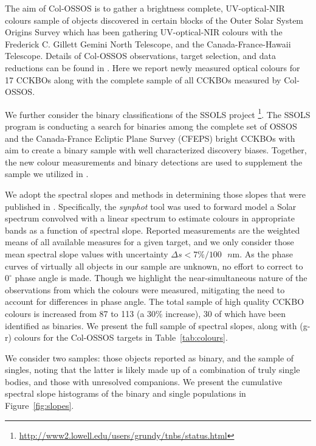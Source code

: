 \documentclass[twocolumn]{aastex63}
\begin{document}
The aim of Col-OSSOS is to gather a brightness complete, UV-optical-NIR colours sample of objects discovered in certain blocks of the Outer Solar System Origins Survey \citep{Bannister2018} which has been gathering UV-optical-NIR colours with the Frederick C. Gillett Gemini North Telescope, and the Canada-France-Hawaii Telescope.  Details of Col-OSSOS observations, target selection, and data reductions can be found in \citet{Schwamb2019}. Here we report newly measured optical colours for 17 CCKBOs along with the complete sample of all CCKBOs measured by Col-OSSOS.

We further consider the binary classifications of the SSOLS project \citep{Parker2020DPS, Benecchi2020DPS}\footnote{\url{http://www2.lowell.edu/users/grundy/tnbs/status.html}}. The SSOLS program is conducting a search for binaries among the complete set of  OSSOS and the Canada-France Ecliptic Plane Survey (CFEPS) bright CCKBOs with aim to create a binary sample with well characterized discovery biases. Together, the new colour measurements and binary detections are used to supplement the sample we utilized in \citet{Fraser2017}.



We adopt the spectral slopes and methods in determining those slopes that were published in \citet{Fraser2017}. Specifically, the {\it synphot} tool was used to forward model a Solar spectrum convolved with a linear spectrum to estimate colours in appropriate bands as a function of spectral slope. Reported measurements are the weighted means of all available measures for a given target, and we only consider those mean spectral slope values with uncertainty $\Delta s<7\%/100\mbox{ $n$m}$. As the phase curves of virtually all objects in our sample are unknown, no effort to correct to $0^\circ$ phase angle is made.  Though we highlight the near-simultaneous nature of the observations from which the colours were measured, mitigating the need to account for differences in phase angle. The total sample of high quality CCKBO colours is increased from 87 to 113 (a 30\% increase), 30 of which have been identified as binaries. We present the full sample of spectral slopes, along with (g-r) colours for the Col-OSSOS targets in Table~\ref{tab:colours}.

We consider two samples: those objects reported as binary, and the sample of singles, noting that the latter is likely made up of a combination of truly single bodies, and those with unresolved companions. We present the cumulative spectral slope histograms of the binary and single populations in Figure~\ref{fig:slopes}. 
\end{document}

